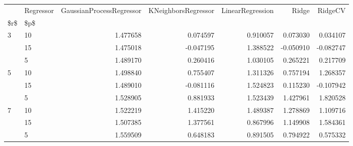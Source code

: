\begin{tabular}{llrrrrr}
\toprule
  & Regressor &  GaussianProcessRegressor &  KNeighborsRegressor &  LinearRegression &     Ridge &   RidgeCV \\
\$r\$ & \$p\$ &                           &                      &                   &           &           \\
\midrule
3 & 10 &                  1.477658 &             0.074597 &          0.910057 &  0.073030 &  0.034107 \\
  & 15 &                  1.475018 &            -0.047195 &          1.388522 & -0.050910 & -0.082747 \\
  & 5 &                  1.489170 &             0.260416 &          1.030105 &  0.265221 &  0.217709 \\
5 & 10 &                  1.498840 &             0.755407 &          1.311326 &  0.757194 &  1.268357 \\
  & 15 &                  1.489010 &            -0.081116 &          1.524823 &  0.115230 & -0.107942 \\
  & 5 &                  1.528905 &             0.881933 &          1.523439 &  1.427961 &  1.820528 \\
7 & 10 &                  1.522219 &             1.415220 &          1.489387 &  1.278869 &  1.109716 \\
  & 15 &                  1.507385 &             1.377561 &          0.867996 &  1.149908 &  1.584361 \\
  & 5 &                  1.559509 &             0.648183 &          0.891505 &  0.794922 &  0.575332 \\
\bottomrule
\end{tabular}
